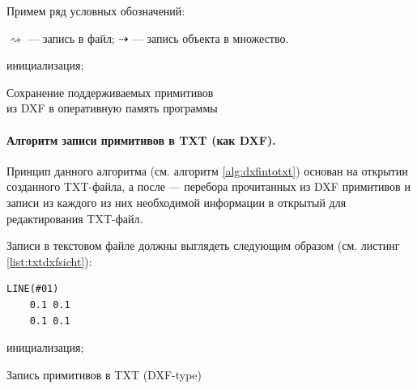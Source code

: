 Примем ряд условных обозначений:

$\rightsquigarrow$ --- запись в файл;
$\dashrightarrow$ --- запись объекта в множество.


\begin{algorithm}[H]
	\SetAlgoLined
	инициализация;
	
	
	
	\caption[Сохранение поддерживаемых примитивов; из DXF в оперативную память программы]
	{Сохранение поддерживаемых примитивов \\ из DXF в оперативную память программы\endtabular}
	\label{alg:readdxf}
\end{algorithm}

\paragraph{Алгоритм записи примитивов в TXT (как DXF).} Принцип данного алгоритма (см. алгоритм \ref{alg:dxfintotxt}) основан на открытии созданного TXT-файла, а после --- перебора прочитанных из DXF примитивов и записи из каждого из них необходимой информации в открытый для редактирования TXT-файл.

Записи в текстовом файле должны выглядеть следующим образом (см. листинг \ref{list:txtdxfsicht}):

\begin{lstlisting}[caption={Пример содержания TXT-файла (как DXF)},label=list:txtdxfsicht]
	LINE(#01)
	0.1 0.1
	0.1 0.1
\end{lstlisting}

\begin{algorithm}[H]
	\SetAlgoLined
	инициализация;
	\caption{Запись примитивов в TXT (DXF-type)}
	\label{alg:dxfintotxt}
\end{algorithm}

